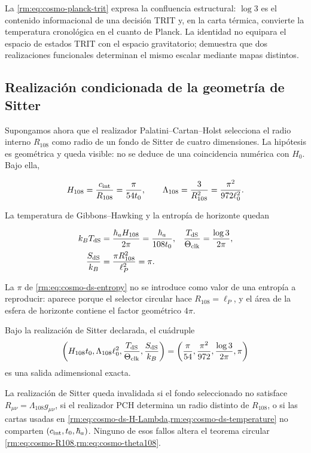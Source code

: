 La \cref{rm:eq:cosmo-planck-trit} expresa la confluencia estructural:
\(\log3\) es el contenido informacional de una decisi\'on TRIT y, en la
carta t\'ermica, convierte la temperatura cronol\'ogica en el cuanto de
Planck. La identidad no equipara el espacio de estados TRIT con el espacio
gravitatorio; demuestra que dos realizaciones funcionales determinan el
mismo escalar mediante mapas distintos.

\subsection{Realizaci\'on condicionada de la geometr\'ia de Sitter}

Supongamos ahora que el realizador Palatini--Cartan--Holst selecciona el radio
interno \(R_{108}\) como radio de un fondo de Sitter de cuatro dimensiones. La
hip\'otesis es geom\'etrica y queda visible: no se deduce de una coincidencia
num\'erica con \(H_0\). Bajo ella,

\begin{equation}
H_{108}=\frac{c_{\rm int}}{R_{108}}
=\frac{\pi}{54t_0},
\qquad
\Lambda_{108}=\frac{3}{R_{108}^2}
=\frac{\pi^2}{972\ell_0^2}.
\label{rm:eq:cosmo-ds-H-Lambda}
\end{equation}

La temperatura de Gibbons--Hawking y la entrop\'ia de horizonte quedan

\begin{align}
k_BT_{\rm dS}
&=\frac{\hbar_a H_{108}}{2\pi}
=\frac{\hbar_a}{108t_0},
&
\frac{T_{\rm dS}}{\Theta_{\rm clk}}
&=\frac{\log3}{2\pi},
\label{rm:eq:cosmo-ds-temperature}\\
\frac{S_{\rm dS}}{k_B}
&=\frac{\pi R_{108}^2}{\ell_P^2}=\pi.
\label{rm:eq:cosmo-ds-entropy}
\end{align}

La \(\pi\) de \cref{rm:eq:cosmo-ds-entropy} no se introduce como valor de una
entrop\'ia a reproducir: aparece porque el selector circular hace
\(R_{108}=\ell_P\), y el \'area de la esfera de horizonte contiene el factor
geom\'etrico \(4\pi\).

\begin{proposition}
Bajo la realizaci\'on de Sitter declarada, el cu\'adruple
\[
\left(
H_{108}t_0,
\Lambda_{108}\ell_0^2,
\frac{T_{\rm dS}}{\Theta_{\rm clk}},
\frac{S_{\rm dS}}{k_B}
\right)
=\left(
\frac\pi{54},
\frac{\pi^2}{972},
\frac{\log3}{2\pi},
\pi
\right)
\]
es una salida adimensional exacta.
\end{proposition}

\begin{falsifier}
La realizaci\'on de Sitter queda invalidada si el fondo seleccionado no
satisface \(R_{\mu\nu}=\Lambda_{108}g_{\mu\nu}\), si el realizador PCH determina
un radio distinto de \(R_{108}\), o si las cartas usadas en
\cref{rm:eq:cosmo-ds-H-Lambda,rm:eq:cosmo-ds-temperature} no comparten
\((c_{\rm int},t_0,\hbar_a)\). Ninguno de esos fallos altera el teorema
circular \cref{rm:eq:cosmo-R108,rm:eq:cosmo-theta108}.
\end{falsifier}
